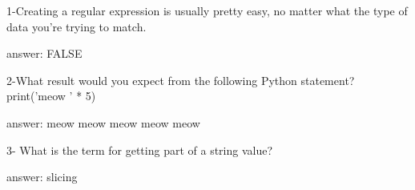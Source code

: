 1-Creating a regular expression is usually pretty easy, no matter what the type of data you're trying to match.


answer: FALSE

2-What result would you expect from the following Python statement?
  print('meow ' * 5)


answer: meow meow meow meow meow

3- What is the term for getting part of a string value?


answer: slicing

